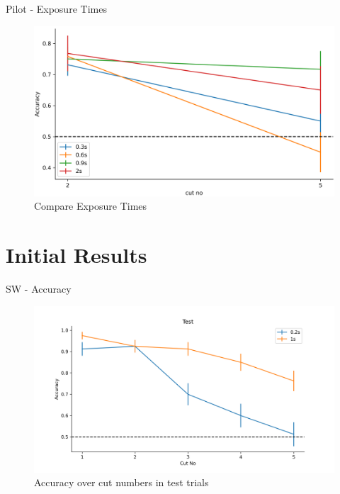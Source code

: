 \documentclass[10pt,xcolor=svgnames]{beamer} %
\begin{document}
\begin{frame}{Pilot - Exposure Times}
    \begin{figure} 
        \hspace*{-0.5cm}
        \centering
        \includegraphics[width=1.1\textwidth]{pictures/ExpTimeComparison.png}
        \caption{Compare Exposure Times}
        \label{fig:comp_exposure_times}
    \end{figure}
\end{frame}



\section{Initial Results}

\begin{frame}{SW - Accuracy}
    \begin{figure}
        \hspace*{-1cm} 
        \centering
        \includegraphics[width = 1.1\textwidth]{pictures/sw_test.png}
        \caption{Accuracy over cut numbers in test trials}
        \label{fig:sw_test_acc}
    \end{figure}
\end{frame}
\end{document}
